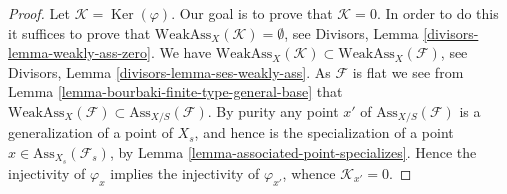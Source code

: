 \documentclass[10pt,a4paper]{amsart}
\theoremstyle{plain}
\theoremstyle{definition}
\theoremstyle{remark}
\numberwithin{equation}{subsection}
\def\Ker{\mathop{\mathrm{Ker}}}
\begin{document}
\begin{proof}
Let $\mathcal{K} = \Ker(\varphi)$. Our goal is to prove that
$\mathcal{K} = 0$. In order to do this it suffices to prove that
$\text{WeakAss}_X(\mathcal{K}) = \emptyset$, see
Divisors, Lemma \ref{divisors-lemma-weakly-ass-zero}.
We have
$\text{WeakAss}_X(\mathcal{K}) \subset \text{WeakAss}_X(\mathcal{F})$, see
Divisors, Lemma \ref{divisors-lemma-ses-weakly-ass}.
As $\mathcal{F}$ is flat we see from
Lemma \ref{lemma-bourbaki-finite-type-general-base}
that $\text{WeakAss}_X(\mathcal{F}) \subset \text{Ass}_{X/S}(\mathcal{F})$.
By purity any point $x'$ of $\text{Ass}_{X/S}(\mathcal{F})$
is a generalization of a point of $X_s$, and hence is the
specialization of a point $x \in \text{Ass}_{X_s}(\mathcal{F}_s)$, by
Lemma \ref{lemma-associated-point-specializes}.
Hence the injectivity of $\varphi_x$ implies the injectivity of
$\varphi_{x'}$, whence $\mathcal{K}_{x'} = 0$.
\end{proof}
\end{document}

